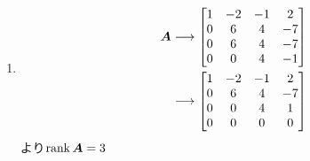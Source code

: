 \begin{ans*}
  ${}$
  \begin{enumerate}[label=(\arabic*)]
    \item
    \begin{align}
      \bm{A}
      &\longrightarrow
      \begin{bmatrix}
        1 & -2 & -1 & 2 \\
        0 & 6 & 4 & -7 \\
        0 & 6 & 4 & -7 \\
        0 & 0 & 4 & -1
      \end{bmatrix} \\
      &\longrightarrow
      \begin{bmatrix}
        1 & -2 & -1 & 2 \\
        0 & 6 & 4 & -7 \\
        0 & 0 & 4 & 1 \\
        0 & 0 & 0 & 0
      \end{bmatrix}
    \end{align}
    より$\operatorname{rank}\bm{A} = 3$


\end{enumerate}
\end{ans*}
